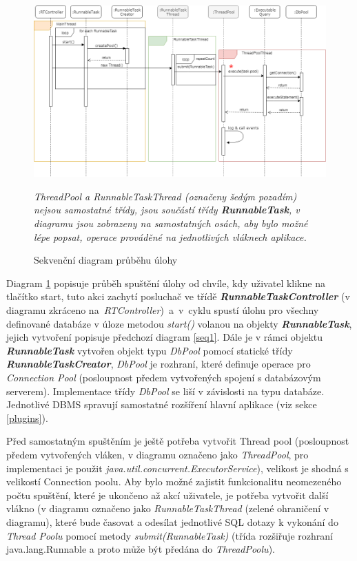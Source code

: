 \documentclass[czech,bachelor,public,dept460,male,cpdeclaration,twoside]{diploma}
\begin{document}
\newpage


\begin{figure}[!htbp]\centering\includegraphics[width=1.0\textwidth]{Figures/runtask.png}\caption{Sekvenční diagram průběhu úlohy}
\label{seqruntask}

\textit{ThreadPool a RunnableTaskThread (označeny šedým pozadím) nejsou samostatné třídy, jsou součástí třídy \textbf{\emph{RunnableTask}}, v diagramu jsou zobrazeny na samostatných osách, aby bylo možné lépe popsat, operace prováděné na jednotlivých vláknech aplikace. }
\end{figure}


Diagram \ref{seqruntask} popisuje průběh spuštění úlohy od chvíle, kdy uživatel klikne na tlačítko start, tuto akci zachytí posluchač ve třídě \textbf{\emph{RunnableTaskController}} (v diagramu zkráceno na~\textit{RTController})~a~v~cyklu spustí úlohu pro všechny definované databáze v úloze metodou \textit{start()} volanou na objekty \textbf{\emph{RunnableTask}}, jejich vytvoření popisuje předchozí diagram \ref{seq1}. Dále je v rámci objektu \textbf{\emph{RunnableTask}} vytvořen objekt typu \textit{DbPool} pomocí statické třídy \textbf{\emph{RunnableTaskCreator}}, \textit{DbPool} je rozhraní, které definuje operace pro \textit{Connection Pool} (posloupnost předem vytvořených spojení s databázovým serverem). Implementace třídy \textit{DbPool} se liší v závislosti na typu databáze. Jednotlivé DBMS spravují samostatné rozšíření hlavní aplikace (viz sekce \ref{plugins}).


Před samostatným spuštěním je ještě potřeba vytvořit Thread pool (posloupnost předem vytvořených vláken, v diagramu označeno jako \textit{ThreadPool}, pro implementaci je použit \newline \textit{java.util.concurrent.ExecutorService}), velikost je shodná s velikostí Connection poolu. Aby bylo možné zajistit funkcionalitu neomezeného počtu spuštění, které je ukončeno až akcí uživatele, je potřeba vytvořit další vlákno (v diagramu označeno jako \textit{RunnableTaskThread} (zelené ohraničení v diagramu), které bude časovat a odesílat jednotlivé SQL dotazy k vykonání do \textit{Thread Poolu} pomocí metody \textit{submit(RunnableTask)} (třída rozšiřuje rozhraní java.lang.Runnable a proto může být předána do \textit{ThreadPoolu}).
\end{document}
